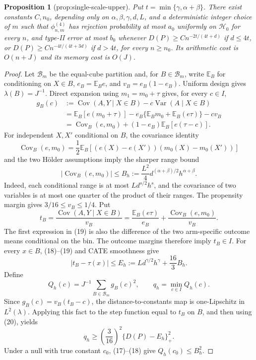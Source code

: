 \documentclass{article}
\newtheorem{proposition}{Proposition}
\begin{document}
\begin{proposition}[prop:single-scale-upper]\label{prop:single-scale-upper}
Put \(t=\min\{\gamma,\alpha+\beta\}\). There exist constants \(C,n_0\), depending only on \(\alpha,\beta,\gamma,d,L\), and a deterministic integer choice of \(m\) such that \(\phi_{n,m}^{(4)}\) has rejection probability at most \(a_0\) uniformly on \(\mathcal H_0\) for every \(n\), and type-II error at most \(b_0\) whenever \(D(P)\ge C n^{-2t/(4t+d)}\) if \(d\le4t\), or \(D(P)\ge C n^{-4t/(4t+3d)}\) if \(d>4t\), for every \(n\ge n_0\). Its arithmetic cost is \(O(n+J)\) and its memory cost is \(O(J)\).
\end{proposition}
\begin{proof}
Let \(\mathcal B_m\) be the equal-cube partition and, for \(B\in\mathcal B_m\), write \(\mathbb E_B\) for conditioning on \(X\in B\), \(e_B=\mathbb E_Be\), and \(v_B=e_B(1-e_B)\). Uniform design gives \(\lambda(B)=J^{-1}\). Direct expansion using \(m_1=m_0+\tau\) gives, for every \(c\in I\),
\[
 \begin{aligned}
 g_B(c)
 &:=\operatorname{Cov}(A,Y\mid X\in B)-c\operatorname{Var}(A\mid X\in B)\\
 &=\mathbb E_B[e(m_0+\tau)]-e_B\{\mathbb E_Bm_0+\mathbb E_B(e\tau)\}-cv_B\\
 &=\operatorname{Cov}_B(e,m_0)+(1-e_B)\mathbb E_B[e(\tau-c)].
 \end{aligned}                                                       \tag{17}
\]
For independent \(X,X'\) conditional on \(B\), the covariance identity
\[
 \operatorname{Cov}_B(e,m_0)
 =\frac12\mathbb E_B[(e(X)-e(X'))(m_0(X)-m_0(X'))]
\]
and the two Hölder assumptions imply the sharper range bound
\[
 |\operatorname{Cov}_B(e,m_0)|
 \le B_h:=\frac{L^2}{4}d^{(\alpha+\beta)/2}h^{\alpha+\beta}.          \tag{18}
\]
Indeed, each conditional range is at most \(Ld^{s/2}h^s\), and the covariance of two variables is at most one quarter of the product of their ranges. The propensity margin gives \(3/16\le v_B\le1/4\). Put
\[
 t_B=\frac{\operatorname{Cov}(A,Y\mid X\in B)}{v_B}
     =\frac{\mathbb E_B(e\tau)}{e_B}
      +\frac{\operatorname{Cov}_B(e,m_0)}{v_B}.                       \tag{19}
\]
The first expression in (19) is also the difference of the two arm-specific outcome means conditional on the bin. The outcome margins therefore imply \(t_B\in I\). For every \(x\in B\), (18)--(19) and CATE smoothness give
\[
 |t_B-\tau(x)|\le E_h
 :=Ld^{\gamma/2}h^\gamma+\frac{16}{3}B_h.                            \tag{20}
\]
Define
\[
 Q_h(c)=J^{-1}\sum_{B\in\mathcal B_m}g_B(c)^2,
 \qquad q_h=\min_{c\in I}Q_h(c).
\]
Since \(g_B(c)=v_B(t_B-c)\), the distance-to-constants map is one-Lipschitz in \(L^2(\lambda)\). Applying this fact to the step function equal to \(t_B\) on \(B\), and then using (20), yields
\[
 q_h\ge\left(\frac3{16}\right)^2\{D(P)-E_h\}_+^2.                    \tag{21}
\]
Under a null with true constant \(c_0\), (17)--(18) give \(Q_h(c_0)\le B_h^2\).


\end{proof}
\end{document}
